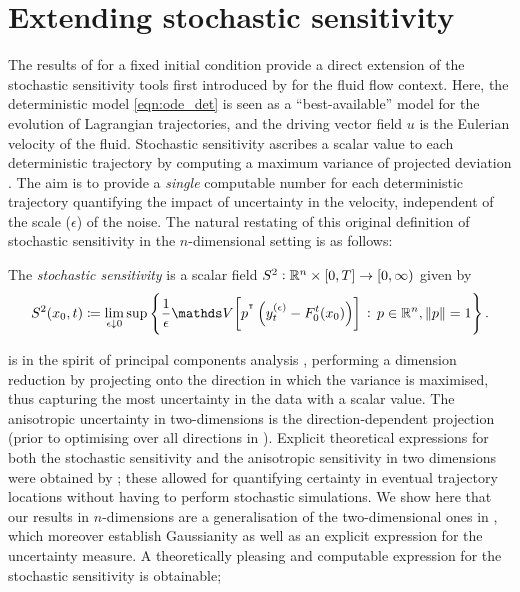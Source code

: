\section{Extending stochastic sensitivity}\label{sec:theory_s2}
The results of  for a fixed initial condition provide a direct extension of the stochastic sensitivity tools first introduced by \citet{Balasuriya_2020_StochasticSensitivityComputable} for the fluid flow context.
Here, the deterministic model \cref{eqn:ode_det} is seen as a ``best-available'' model for the evolution of Lagrangian trajectories, and the driving vector field \(u\) is the Eulerian velocity of the fluid.
Stochastic sensitivity ascribes a scalar value to each deterministic trajectory by computing a maximum variance of projected deviation \cite{Balasuriya_2020_StochasticSensitivityComputable}.
The aim is to provide a \emph{single} computable number for each deterministic trajectory quantifying the impact of uncertainty in the velocity, independent of the scale (\(\epsilon\)) of the noise.
The natural restating of this original definition of stochastic sensitivity \cite{Balasuriya_2020_StochasticSensitivityComputable} in the $ n $-dimensional setting is as follows:

\begin{definition}\label{def:ss_Rn}
	The \emph{stochastic sensitivity} is a scalar field \(S^2: \mathbb{R}^n \times [0,T] \to \left[0, \infty\right)\) given by
	\begin{equation*}
		S^2\!\left(x_0,t\right) \coloneqq \lim_{\epsilon\downarrow 0}\sup\set{\frac{1}{\epsilon}\var{p^{\T}\left(y_t^{(\epsilon)} - F_0^t\!\left(x_0\right)\right)} \,: \, p \in \R^n, \, \norm{p} = 1}.
	\end{equation*}
\end{definition}

 is in the spirit of principal components analysis \cite{Jolliffe_2002_PrincipalComponentAnalysis}, performing a dimension reduction by projecting onto the direction in which the variance is maximised, thus capturing the most uncertainty in the data with a scalar value.
The anisotropic uncertainty in two-dimensions \cite{Balasuriya_2020_StochasticSensitivityComputable} is the direction-dependent projection (prior to optimising over all directions in ).
Explicit theoretical expressions for both the stochastic sensitivity and the anisotropic sensitivity in two dimensions were obtained by \citet{Balasuriya_2020_StochasticSensitivityComputable}; these allowed for quantifying certainty in eventual trajectory locations without having to perform stochastic simulations.
We show here that our results in \(n\)-dimensions are a generalisation of the two-dimensional ones in \cite{Balasuriya_2020_StochasticSensitivityComputable}, which moreover establish Gaussianity as well as an explicit expression for the uncertainty measure.
A theoretically pleasing and computable expression for the stochastic sensitivity is obtainable;


